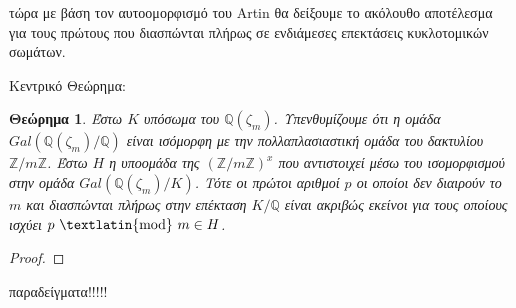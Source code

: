 \documentclass[oneside,a4paper]{article}
\newtheorem{theorem}{Θεώρημα}
\newcommand {\tl}{\textlatin}
\newcommand{\Z}{\mathbb{Z}}
\newcommand{\Q}{\mathbb{Q}}
\begin{document}
τώρα με βάση τον αυτοομορφισμό του \tl{Artin} θα δείξουμε το ακόλουθο αποτέλεσμα για τους πρώτους που διασπώνται πλήρως σε ενδιάμεσες επεκτάσεις κυκλοτομικών σωμάτων.


Κεντρικό Θεώρημα:

\begin{theorem}
	Έστω $K$ υπόσωμα του $\Q (\zeta_m)$. Υπενθυμίζουμε ότι η ομάδα $Gal(\Q (\zeta_m)/ \Q)$ είναι ισόμορφη με την πολλαπλασιαστική ομάδα του δακτυλίου $\Z / m \Z$. Έστω $H$ η υποομάδα της $\left(\Z / m \Z \right)^x$ που αντιστοιχεί μέσω του ισομορφισμού στην ομάδα $Gal(\Q(\zeta_m)/ K)$. Τότε οι πρώτοι αριθμοί $p$ οι οποίοι δεν διαιρούν το $m$ και διασπώνται πλήρως στην επέκταση $K/ \Q$ είναι ακριβώς εκείνοι για τους οποίους ισχύει $ p \text{ \tl{mod} } m \in H$.
\end{theorem}
\begin{proof}
\end{proof}

παραδείγματα!!!!!

\end{document}
